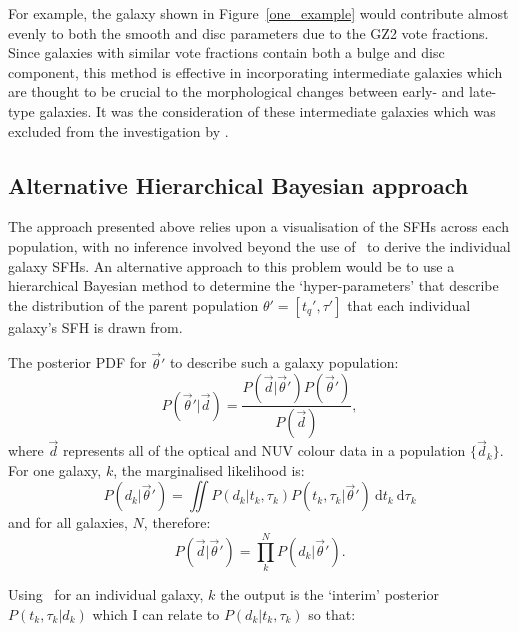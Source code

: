 For example, the galaxy shown in Figure~\ref{one_example} would contribute almost evenly to both the smooth and disc parameters due to the GZ2 vote fractions. Since galaxies with similar vote fractions contain both a bulge and disc component, this method is effective in incorporating intermediate galaxies which are thought to be crucial to the morphological changes between early- and late-type galaxies. It was the consideration of these intermediate galaxies which was excluded from the investigation by \citet{schawinski14}.

\subsection{Alternative Hierarchical Bayesian approach}\label{althyper}

The approach presented above relies upon a visualisation of the SFHs across each population, with no inference involved beyond the use of \starpy\ to derive the individual galaxy SFHs. An alternative approach to this problem would be to use a hierarchical Bayesian method to determine the `hyper-parameters' that describe the distribution of the parent population $\theta' = [t_q', \tau']$ that each individual galaxy's SFH is drawn from. 

The posterior PDF for $\vec{\theta}'$ to describe such a galaxy population:
\begin{equation}\label{hyper}
P(\vec{\theta}'|\vec{d}) = \frac{P(\vec{d}|\vec{\theta}')P(\vec{\theta}')}{P(\vec{d})}, 
\end{equation}
where $\vec{d}$ represents all of the optical and NUV colour data in a population $\{\vec{d}_k\}$. For one galaxy, $k$, the marginalised likelihood is:
\begin{equation}\label{one}
P(d_k|\vec{\theta}') = \iint \! P(d_k|t_k, \tau_k) P(t_k, \tau_k|\vec{\theta}') \ \mathrm{d}t_k ~ \mathrm{d}\tau_k
\end{equation}
and for all galaxies, $N$, therefore: 
\begin{equation}
P(\vec{d}|\vec{\theta}') = \prod_k^N P(d_k|\vec{\theta}').
\end{equation}

Using \starpy\ for an individual galaxy, $k$ the output is the `interim' posterior $P(t_k, \tau_k|d_k)$ which I can relate to $P(d_k|t_k, \tau_k)$  so that:

